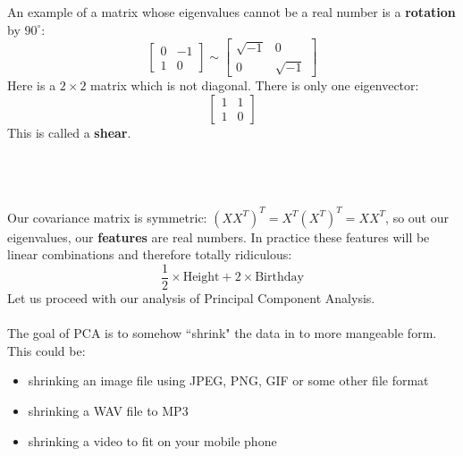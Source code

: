 \documentclass[12pt]{article}
\begin{document}
\noindent An example of a matrix whose eigenvalues cannot be a real number is a \textbf{rotation} by $90^\circ$: 
$$ \left[ \begin{array}{cr} 0 & -1 \\ 1 & 0 \end{array}\right] 
\sim \left[ \begin{array}{cr} \sqrt{-1} & 0 \\ 0 & \sqrt{-1} \end{array}\right] $$
Here is a $2 \times 2$ matrix which is not diagonal.  There is only one eigenvector:
$$ \left[ \begin{array}{cr} 1 & 1 \\ 1 & 0 \end{array}\right] $$
This is called a \textbf{shear}.  \\ \\
\\ \\
Our covariance matrix is symmetric: $(X X^T)^T = X^T (X^T)^T = X X^T$, so out our eigenvalues, our {\color{green!20!blue} \textbf{features}} are real numbers.  In practice these features will be linear combinations and therefore totally ridiculous:
$$ \frac{1}{2} \times \text{Height} + 2 \times \text{Birthday} $$
Let us proceed with our analysis of Principal Component Analysis.\\ \\
The goal of PCA is to somehow ``shrink" the data in to more mangeable form.  This could be:
\begin{itemize}
\item shrinking an image file using JPEG, PNG, GIF or some other file format
\item shrinking a WAV file to MP3
\item shrinking a video to fit on your mobile phone
\end{itemize}
\end{document}
